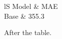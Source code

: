 \documentclass{article}
\begin{document}
\begin{acronym}
\end{acronym}
\begin{tabular}{lS}
Model & \ac{MAE} \\
Base & 355.3 \\
\end{tabular}

After the table.
\end{document}
